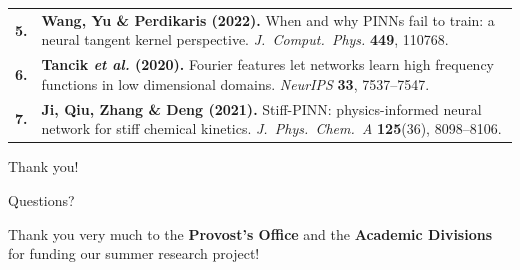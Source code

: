 \documentclass[aspectratio=169,11pt]{beamer}
\newcommand{\refnum}[1]{\textcolor{Cobalt}{\bfseries #1}}
\newcommand{\refwhy}[1]{{\itshape\color{Muted}#1}}
\begin{document}
\begin{frame}[plain]
\begin{minipage}{0.965\textwidth}
\begin{tabular}{@{}p{0.75cm}@{}p{\dimexpr\linewidth-0.75cm\relax}@{}}
      \refnum{5.} & \textbf{Wang, Yu \& Perdikaris (2022).}
        When and why PINNs fail to train: a neural tangent kernel perspective.
        \emph{J.\ Comput.\ Phys.} \textbf{449}, 110768.\\[5.5pt]

      \refnum{6.} & \textbf{Tancik \emph{et al.} (2020).}
        Fourier features let networks learn high frequency functions in low
        dimensional domains. \emph{NeurIPS} \textbf{33}, 7537--7547.\\[5.5pt]

      \refnum{7.} & \textbf{Ji, Qiu, Zhang \& Deng (2021).}
        Stiff-PINN: physics-informed neural network for stiff chemical kinetics.
        \emph{J.\ Phys.\ Chem.\ A} \textbf{125}(36), 8098--8106.
    \end{tabular}
  \end{minipage}
\end{frame}

\begin{frame}{Thank you!}
  \centering
  \vspace{1.1cm}
  {\Large Questions?\par}
  \vspace{0.9cm}
  {\normalsize Thank you very much to the \textbf{Provost's Office} and the \textbf{Academic Divisions} for funding our summer research project!\par}
\end{frame}
\end{document}
